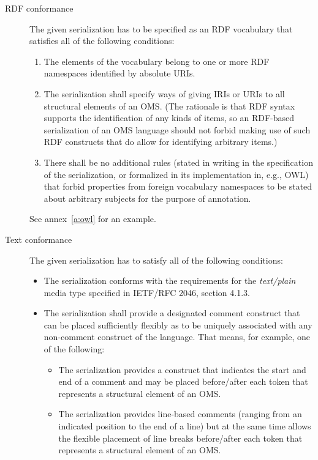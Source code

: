 \documentclass[10pt,fleqn,final]{scrreprt}
\makeatletter
\newcommand*{\eg}{e.g.\@\xspace}
\newcommand*\CommentAuthor{}
\renewcommand*\CommentAuthor{#1}}
\newcommand*\CommentDate{}
\renewcommand*\CommentDate{#1}}
\newcommand*\CommentId{}
\renewcommand*\CommentId{#1}}
\newcommand*\CommentType{}
\renewcommand*\CommentType{#1}}
\newcommand*{\SetCommentColorByType}[1]{%
\edef\localType{{#1}}%
\expandafter\ifstrequal\localType{q-aut}{\colorlet{CommentColor}{red}}{%
\expandafter\ifstrequal\localType{q-all}{\colorlet{CommentColor}{orange}}{%
\expandafter\ifstrequal\localType{todo}{\colorlet{CommentColor}{orange}}{%
\expandafter\ifstrequal\localType{fyi}{\colorlet{CommentColor}{lightgray}}{%
\colorlet{CommentColor}{yellow}}}}}}
\newcommand*{\SetCommentPrefixByType}[1]{%
\edef\localType{{#1}}%
\expandafter\@ifmtarg\localType{%
\edef\CommentPrefix{}%
}{%
\caseupper[q]{#1}%
\edef\CommentPrefix{\thestring: }%
}}
\newcommand*{\initComment}[1]{%
\setkeys{Comment}{#1}%
\SetCommentColorByType{\CommentType}%
\relax%
\SetCommentPrefixByType{\CommentType}%
\relax%
}
\newcommand*{\todonote}[2][]{%
\initComment{#1}%
\pdfcomment[author=\CommentAuthor,color=CommentColor,date=\CommentDate,id=\CommentId]{%
\CommentPrefix
#2}}
\renewcommand*{\todonote}[2][]{%
\initComment{#1}%
\ednote{\CommentPrefix #2}}
\newcommand*{\mimetype}[1]{\textit{#1}}
\newcommand{\nisref}[1]{#1}
\makeatother
\begin{document}
\begin{description}
\item[RDF conformance]
The given serialization has to be specified as an RDF vocabulary that
 satisfies all of the following conditions:
\begin{enumerate}
\item The elements of the vocabulary belong to one or more RDF namespaces
 identified by absolute URIs.
\item\label{it:ids-for-structure} The serialization shall specify ways of giving IRIs or URIs to all structural elements of an OMS. (The  rationale is that RDF syntax supports the identification of any kinds of items, so an RDF-based serialization of an OMS language should not forbid making use of such RDF constructs that do allow for identifying arbitrary items.)
\item There shall be no additional rules (stated in writing in the specification of the serialization, or formalized in its implementation in, e.g., OWL) that forbid properties from foreign vocabulary namespaces to be stated about arbitrary subjects for the purpose of annotation.
\end{enumerate}

See annex~\ref{a:owl} for an example.


\item[Text conformance]
The given serialization has to satisfy all of the following conditions:
\begin{itemize}
\item The serialization conforms with the requirements for the \mimetype{text/plain} media type specified in \nisref{IETF/RFC 2046}, section 4.1.3.
\item The serialization shall provide a designated comment construct that can be placed sufficiently flexibly as to be uniquely associated with any non-comment construct of the language.  That means, for example, one of the following:
  \begin{itemize}
  \item The serialization provides a construct that indicates the start and end of a comment and may be placed before/after each token that represents a structural element of an OMS.
  \item The serialization provides line-based comments (ranging from an indicated position to the end of a line) but at the same time allows the flexible placement of line breaks before/after each token that represents a structural element of an OMS.
  \end{itemize}
\end{itemize}


\end{description}
\end{document}
